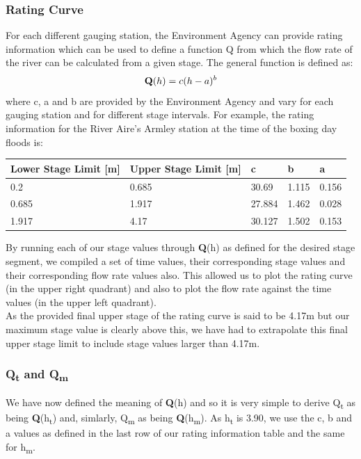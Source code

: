 \documentclass[11 pt, a4paper]{article}
\begin{document}
\subsubsection{Rating Curve}
For each different gauging station, the Environment Agency can provide rating information which can be used to define a function Q from which the flow rate of the river can be calculated from a given stage. The general function is defined as:
\[{\bf Q}(h)=c(h-a)^b\]
where c, a and b are provided by the Environment Agency and vary for each gauging station and for different stage intervals. For example, the rating information for the River Aire's Armley station at the time of the boxing day floods is:
\begin{center}
\begin{tabular}{|l|l|l|l|l|}
\hline
Lower Stage Limit {[}m{]} & Upper Stage Limit {[}m{]} & c & b & a \\
\hline
0.2 & 0.685 & 30.69 & 1.115 & 0.156 \\
0.685 & 1.917 & 27.884 & 1.462 & 0.028 \\
1.917 & 4.17 & 30.127 & 1.502 & 0.153 \\
\hline
\end{tabular}
\end{center}
By running each of our stage values through {\bf Q}(h) as defined for the desired stage segment, we compiled a set of time values, their corresponding stage values and their corresponding flow rate values also. This allowed us to plot the rating curve (in the upper right quadrant) and also to plot the flow rate against the time values (in the upper left quadrant). \\
As the provided final upper stage of the rating curve is said to be 4.17m but our maximum stage value is clearly above this, we have had to extrapolate this final upper stage limit to include stage values larger than 4.17m.

\subsubsection{Q\textsubscript{t} and Q\textsubscript{m}}
We have now defined the meaning of {\bf Q}(h) and so it is very simple to derive Q\textsubscript{t} as being {\bf Q}(h\textsubscript{t}) and, simlarly, Q\textsubscript{m} as being {\bf Q}(h\textsubscript{m}). As h\textsubscript{t} is 3.90, we use the c, b and a values as defined in the last row of our rating information table and the same for h\textsubscript{m}.
\end{document}
